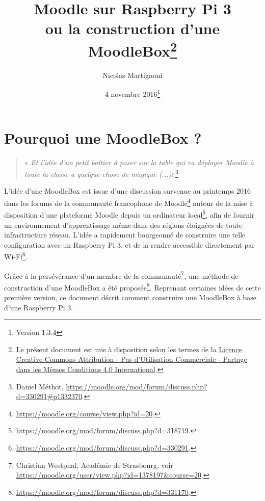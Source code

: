 \documentclass[11pt]{article}
\begin{document}
\title{Moodle sur Raspberry Pi 3\\ ou la construction d'une MoodleBox\footnote{Le présent document est mis à disposition selon les termes de la \href{http://creativecommons.org/licenses/by-nc-sa/4.0/}{Licence Creative Commons Attribution - Pas d'Utilisation Commerciale - Partage dans les Mêmes Conditions 4.0 International}.}}
\date{4 novembre 2016\footnote{Version 1.3.4}}
\author{Nicolas Martignoni}
\maketitle

\begingroup
\setlength{\parskip}{0pt}
\tableofcontents
\endgroup

\section{Pourquoi une MoodleBox ?}

\begin{quote}
\noindent « \emph{Et l'idée d'un petit boîtier à poser sur la table qui va déployer Moodle à toute la classe a quelque chose de magique (...)}»\footnote{Daniel Méthot, \url{https://moodle.org/mod/forum/discuss.php?d=330291\#p1332370}.}
\end{quote}

L'idée d'une MoodleBox est issue d'une discussion survenue au printemps 2016 dans les forums de la communauté francophone de Moodle\footnote{\url{https://moodle.org/course/view.php?id=20}.} autour de la mise à disposition d'une plateforme Moodle depuis un ordinateur local\footnote{\url{https://moodle.org/mod/forum/discuss.php?d=318719}.}, afin de fournir un environnement d'apprentissage même dans des régions éloignées de toute infrastructure réseau. L'idée a rapidement bourgeonné de construire une telle configuration avec un Raspberry Pi 3, et de la rendre accessible directement par Wi-Fi\footnote{\url{https://moodle.org/mod/forum/discuss.php?d=330291}.}.

Grâce à la persévérance d'un membre de la communauté\footnote{Christian Westphal, Académie de Strasbourg, voir \url{https://moodle.org/user/view.php?id=1378197&course=20}.}, une méthode de construction d'une MoodleBox a été proposée\footnote{\url{https://moodle.org/mod/forum/discuss.php?d=331170}.}. Reprenant certaines idées de cette première version, ce document décrit comment construire une MoodleBox à base d'une Raspberry Pi 3.
\end{document}
